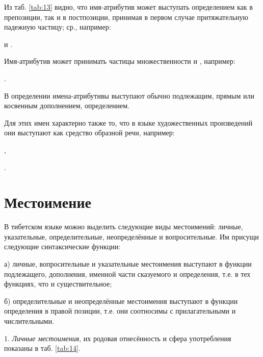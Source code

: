 Из таб. \ref{tab:13} видно, что имя-атрибутив может выступать определением как в препозиции, так и в постпозиции, принимая в первом случае притяжательную падежную частицу; ср., например:
\begin{prfsample}
    \item {} и .
\end{prfsample}

Имя-атрибутив может принимать частицы множественности  и , например:
\begin{prfsample}
    \item {}.
\end{prfsample}

В определении имена-атрибутивы выступают обычно подлежащим, прямым или косвенным дополнением, определением.

Для этих имен характерно также то, что в языке художественных произведений они выступают как средство образной речи, например:
\begin{prfsample}
    \item {},
    \item {}.
\end{prfsample}

\section{Местоимение}

В тибетском языке можно выделить следующие виды местоимений: личные, указательные, определительные, неопределённые и вопросительные. Им присущи следующие синтаксические функции:

а) личные, вопросительные и указательные местоимения выступают в функции подлежащего, дополнения, именной части сказуемого и определения, т.е. в тех функциях, что и существительное;

б) определительные и неопределённые местоимения выступают в функции определения в правой позиции, т.е. они соотносимы с прилагательными и числительными.

1. \emph{Личные местоимения}, их родовая отнесённость и сфера употребления показаны в  таб. \ref{tab:14}.

